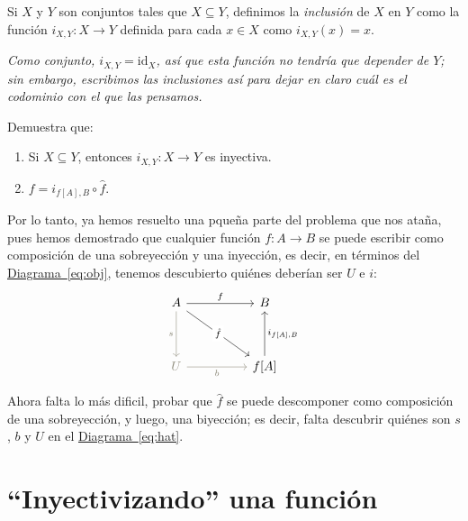 \documentclass[letterpaper,DIV=14,headsepline,12pt]{scrartcl}
\newcommand{\pts}{}
\newenvironment{ejercicio}[1]{\ifthenelse{\equal{#1}{1} \OR \equal{#1}{+1}}{\renewcommand{\pts}{\textbf{(#1 pt)}}}{\renewcommand{\pts}{\textbf{(#1 pts)}}}\begin{ejj}\upshape \pts}{\end{ejj}}
\newcommand{\id}{\mathrm{id}}
\begin{document}
    \begin{definicion}
        Si $X$ y $Y$ son conjuntos tales que $X \subseteq Y$, definimos la \textit{inclusión} de $X$ en $Y$ como la función $i_{X,Y}:X \to Y$ definida para cada $x \in X$ como $i_{X,Y}(x) = x$.

        \textit{Como conjunto, $i_{X,Y}=\id_X$, así que esta función no tendría que depender de $Y$; sin embargo, escribimos las inclusiones así para dejar en claro cuál es el codominio con el que las pensamos.}
    \end{definicion}

    \begin{ejercicio}{1.5}
        Demuestra que:
        \begin{enumerate}
            \item Si $X \subseteq Y$, entonces $i_{X,Y}:X \to Y$ es inyectiva.
            \item $f=i_{f[A],B} \circ \hat{f}$.
        \end{enumerate}
    \end{ejercicio}

    Por lo tanto, ya hemos resuelto una pqueña parte del problema que nos ataña, pues hemos demostrado que cualquier función $f:A \to B$ se puede escribir como composición de una sobreyección y una inyección, es decir, en términos del \hyperref[eq:obj]{Diagrama~\ref*{eq:obj}}, tenemos descubierto quiénes deberían ser $U$ e $i$:
    \begin{equation}\label{eq:hat}
        \begin{tikzcd}
            A && B \\
            \\
            \textcolor{Cornsilk4}{U} && {f[A]}
            \arrow["f", from=1-1, to=1-3]
            \arrow["s"', from=1-1, to=3-1, draw=Cornsilk4, text=Cornsilk4]
            \arrow["{\hat{f}}"{description}, from=1-1, to=3-3]
            \arrow["b"', from=3-1, to=3-3, draw=Cornsilk4, text=Cornsilk4]
            \arrow["{i_{f[A],B}}"', from=3-3, to=1-3]
        \end{tikzcd}
    \end{equation}

    Ahora falta lo más dificil, probar que $\hat{f}$ se puede descomponer como composición de una sobreyección, y luego, una biyección; es decir, falta descubrir quiénes son $s$, $b$ y $U$ en el \hyperref[eq:hat]{Diagrama~\ref*{eq:hat}}.

    \section*{``Inyectivizando'' una función}
\end{document}
